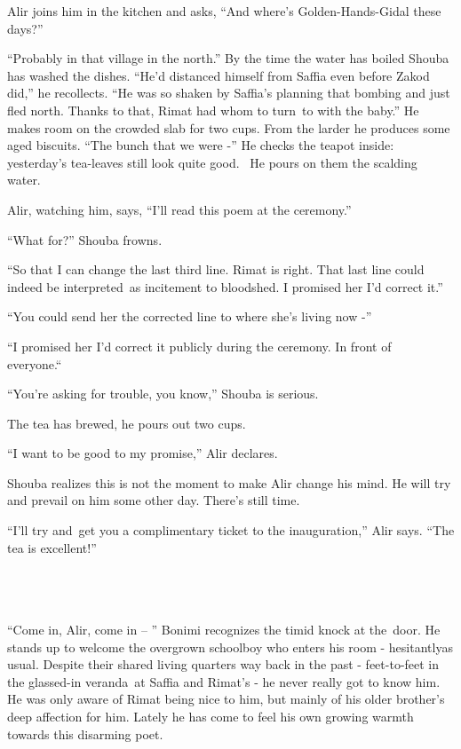 \documentclass[twoside,11pt]{book}
\begin{document}
Alir joins him in the kitchen and asks, ``And where's Golden-Hands-Gidal these days?''

``Probably in that village in the north.'' By the time the water has boiled Shouba has washed
the dishes. ``He'd distanced himself from Saffia even before Zakod did,'' he recollects.
``He was so shaken by Saffia's planning that bombing and just fled north. Thanks to that, Rimat had whom
to turn~to with the baby.'' He makes room on the crowded slab for two cups. From the larder he produces
some aged biscuits. ``The bunch that we were -'' He checks the teapot inside: yesterday's
tea-leaves still look quite good. ~He pours on them the scalding water.

Alir, watching him, says, ``I'll read this poem at the ceremony.''~

``What for?'' Shouba frowns. \

``So that I can change the last third line. Rimat is right. That last line could indeed be interpreted~as
incitement to bloodshed. I promised her I'd correct it.''

``You could send her the corrected line to where she's living now -''

``I promised her I'd correct it publicly during the ceremony. In front of everyone.``~

``You're asking for trouble, you know,'' Shouba is serious.

The tea has brewed, he pours out two cups.

``I want to be good to my promise,'' Alir declares.

Shouba realizes this is not the moment to make Alir change his mind. He will try and prevail on him some other day.
There's still time.

``I'll try and~get you a complimentary ticket to the inauguration,'' Alir says.
``The tea is excellent!''

~

\chapter{}

``Come in, Alir, come in -- '' Bonimi recognizes the timid knock at the~door. He stands up to
welcome the overgrown schoolboy who enters his room - hesitantlyas usual. Despite their shared living quarters way back
in the past - feet-to-feet in the glassed-in veranda~at Saffia and Rimat's{ }{}- he never really got to
know him. He was only aware of Rimat being nice to him, but mainly of his older brother's deep affection for him.
Lately he has come to feel his own growing warmth towards this disarming poet.
\end{document}
